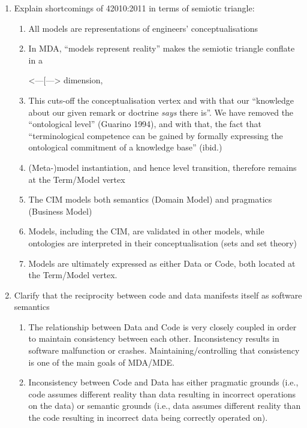 \documentclass[a4paper,11pt,oneside,oldfontcommands]{memoir}
\theoremstyle{definition}
\theoremstyle{break}		%
\numberwithin{equation}{chapter}
\numberwithin{figure}{chapter}
\newcommand{\mywordbox}[1]{%
  {%
   \setlength{\fboxsep}{-2\fboxrule}%
   \hspace{1pt}\fcolorbox{gray!20}{blue!5}{\hspace{2pt}\strut\textbf{#1}\hspace{2pt}}\hspace{1pt}%
  }%
}
\begin{document}
\begin{enumerate}
\def\labelenumi{\arabic{enumi}.}
\tightlist
\item
  Explain shortcomings of 42010:2011 in terms of semiotic triangle:

  \begin{enumerate}
  \def\labelenumii{\arabic{enumii}.}
  \tightlist
  \item
    All models are representations of engineers' conceptualisations
  \item
    In MDA, ``models represent reality'' makes the semiotic triangle
    conflate in a \mywordbox{model}
    \textless{}---{[}\representation{]}---\textgreater{}
    \mywordbox{reality} dimension,
  \item
    This cuts-off the conceptualisation vertex and with that our
    ``knowledge about our given remark or doctrine \emph{says} there
    is''. We have removed the ``ontological level'' (Guarino 1994), and
    with that, the fact that ``terminological competence can be gained
    by formally expressing the ontological commitment of a knowledge
    base'' (ibid.)
  \item
    (Meta-)model instantiation, and hence level transition, therefore
    remains at the Term/Model vertex
  \item
    The CIM models both semantics (Domain Model) and pragmatics
    (Business Model)
  \item
    Models, including the CIM, are validated in other models, while
    ontologies are interpreted in their conceptualisation (sets and set
    theory)
  \item
    Models are ultimately expressed as either Data or Code, both located
    at the Term/Model vertex.
  \end{enumerate}
\item
  Clarify that the reciprocity between code and data manifests itself as
  software semantics

  \begin{enumerate}
  \def\labelenumii{\arabic{enumii}.}
  \tightlist
  \item
    The relationship between Data and Code is very closely coupled in
    order to maintain consistency between each other. Inconsistency
    results in software malfunction or crashes. Maintaining/controlling
    that consistency is one of the main goals of MDA/MDE.
  \item
    Inconsistency between Code and Data has either pragmatic grounds
    (i.e., code assumes different reality than data resulting in
    incorrect operations on the data) or semantic grounds (i.e., data
    assumes different reality than the code resulting in incorrect data
    being correctly operated on).
  \end{enumerate}
\end{enumerate}
\end{document}
